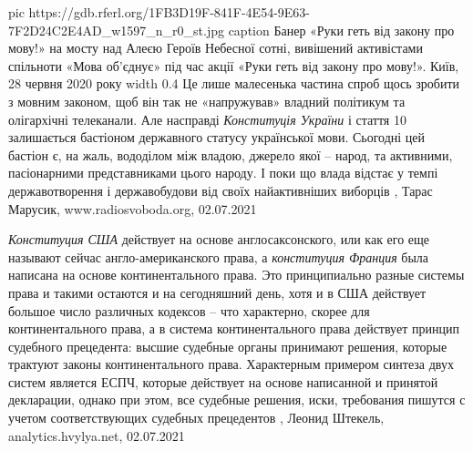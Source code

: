 \ifcmt
  pic https://gdb.rferl.org/1FB3D19F-841F-4E54-9E63-7F2D24C2E4AD_w1597_n_r0_st.jpg
	caption Банер «Руки геть від закону про мову!» на мосту над Алеєю Героїв Небесної сотні, вивішений активістами спільноти «Мова об’єднує» під час акції «Руки геть від закону про мову!». Київ, 28 червня 2020 року
	width 0.4
\fi
Це лише малесенька частина спроб щось зробити з мовним законом, щоб він так не
«напружував» владний політикум та олігархічні телеканали. Але насправді
\emph{Конституція України} і стаття 10 залишається бастіоном державного статусу
української мови. Сьогодні цей бастіон є, на жаль, вододілом між владою,
джерело якої – народ, та активними, пасіонарними представниками цього народу. І
поки що влада відстає у темпі державотворення і державобудови від своїх
найактивніших виборців
, 
Тарас Марусик, www.radiosvoboda.org, 02.07.2021

\emph{Конституция США} действует на основе англосаксонского, или как его еще называют
сейчас англо-американского права, а \emph{конституция Франция} была написана на основе
континентального права. Это принципиально разные системы права и такими
остаются и на сегодняшний день, хотя и в США действует большое число различных
кодексов -- что характерно, скорее для континентального права, а в система
континентального права действует принцип судебного прецедента: высшие судебные
органы принимают решения, которые трактуют законы континентального права.
Характерным примером синтеза двух систем является ЕСПЧ, которые действует на
основе написанной и принятой декларации, однако при этом, все судебные решения,
иски, требования пишутся с учетом соответствующих судебных прецедентов
, 
Леонид Штекель, analytics.hvylya.net, 02.07.2021

